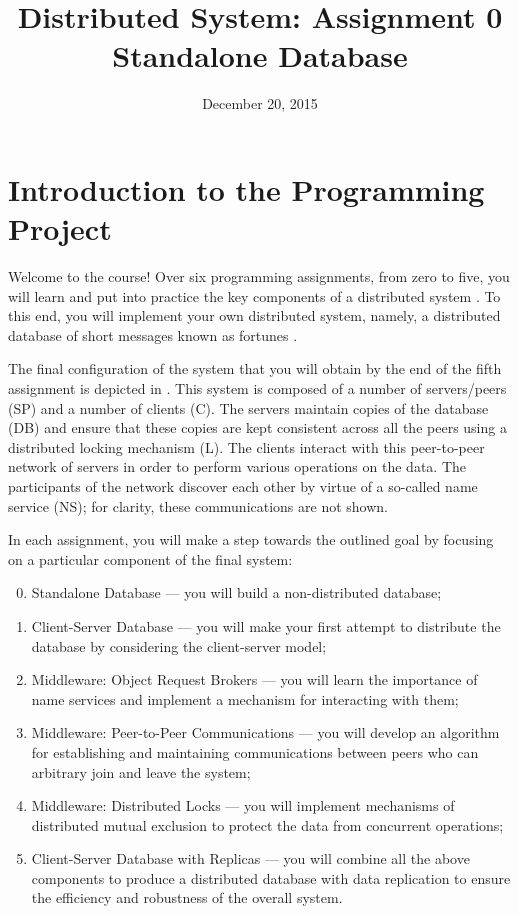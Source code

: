 \documentclass[a4paper,10pt]{article}
\title{Distributed System: Assignment 0\\Standalone Database}
\author{}
\date{December 20, 2015}
\begin{document}
\maketitle

\section{Introduction to the Programming Project} 

Welcome to the course! Over six programming assignments, from zero to five, you
will learn and put into practice the key components of a distributed system
\cite{lecture1}. To this end, you will implement your own distributed system,
namely, a distributed database of short messages known as fortunes
\cite{fortune}.

The final configuration of the system that you will obtain by the end of the
fifth assignment is depicted in . This system is
composed of a number of servers/peers (SP) and a number of clients (C). The
servers maintain copies of the database (DB) and ensure that these copies are
kept consistent across all the peers using a distributed locking mechanism (L).
The clients interact with this peer-to-peer network of servers in order to
perform various operations on the data. The participants of the network discover
each other by virtue of a so-called name service (NS); for clarity, these
communications are not shown.

In each assignment, you will make a step towards the outlined goal by focusing
on a particular component of the final system:
\begin{enumerate}

  \setcounter{enumi}{-1}

  \item Standalone Database --- you will build a non-distributed database;

  \item Client-Server Database --- you will make your first attempt to
  distribute the database by considering the client-server model;

  \item Middleware: Object Request Brokers --- you will learn the importance of
  name services and implement a mechanism for interacting with them;

  \item Middleware: Peer-to-Peer Communications --- you will develop an
  algorithm for establishing and maintaining communications between peers who
  can arbitrary join and leave the system;

  \item Middleware: Distributed Locks --- you will implement mechanisms of
  distributed mutual exclusion to protect the data from concurrent operations;

  \item Client-Server Database with Replicas --- you will combine all the above
  components to produce a distributed database with data replication to ensure
  the efficiency and robustness of the overall system.

\end{enumerate}
\end{document}
